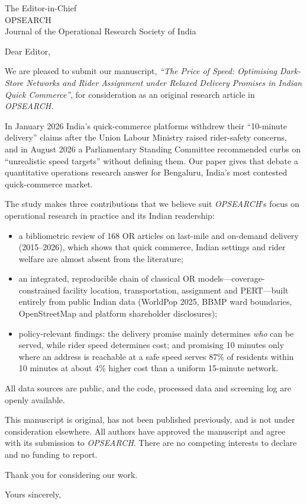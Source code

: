 \documentclass[11pt,a4paper]{letter}
\begin{document}
\begin{letter}{The Editor-in-Chief\\ OPSEARCH\\ Journal of the Operational Research Society of India}
\opening{Dear Editor,}

We are pleased to submit our manuscript, \emph{``The Price of Speed: Optimising Dark-Store Networks and Rider Assignment under Relaxed Delivery Promises in Indian Quick Commerce''}, for consideration as an original research article in \emph{OPSEARCH}.

In January 2026 India's quick-commerce platforms withdrew their ``10-minute delivery'' claims after the Union Labour Ministry raised rider-safety concerns, and in August 2026 a Parliamentary Standing Committee recommended curbs on ``unrealistic speed targets'' without defining them. Our paper gives that debate a quantitative operations research answer for Bengaluru, India's most contested quick-commerce market.

The study makes three contributions that we believe suit \emph{OPSEARCH}'s focus on operational research in practice and its Indian readership:
\begin{itemize}
\item a bibliometric review of 168 OR articles on last-mile and on-demand delivery (2015--2026), which shows that quick commerce, Indian settings and rider welfare are almost absent from the literature;
\item an integrated, reproducible chain of classical OR models---coverage-constrained facility location, transportation, assignment and PERT---built entirely from public Indian data (WorldPop 2025, BBMP ward boundaries, OpenStreetMap and platform shareholder disclosures);
\item policy-relevant findings: the delivery promise mainly determines \emph{who} can be served, while rider speed determines cost; and promising 10 minutes only where an address is reachable at a safe speed serves 87\% of residents within 10 minutes at about 4\% higher cost than a uniform 15-minute network.
\end{itemize}

All data sources are public, and the code, processed data and screening log are openly available.

This manuscript is original, has not been published previously, and is not under consideration elsewhere. All authors have approved the manuscript and agree with its submission to \emph{OPSEARCH}. There are no competing interests to declare and no funding to report.

Thank you for considering our work.

\closing{Yours sincerely,}
\end{letter}
\end{document}
